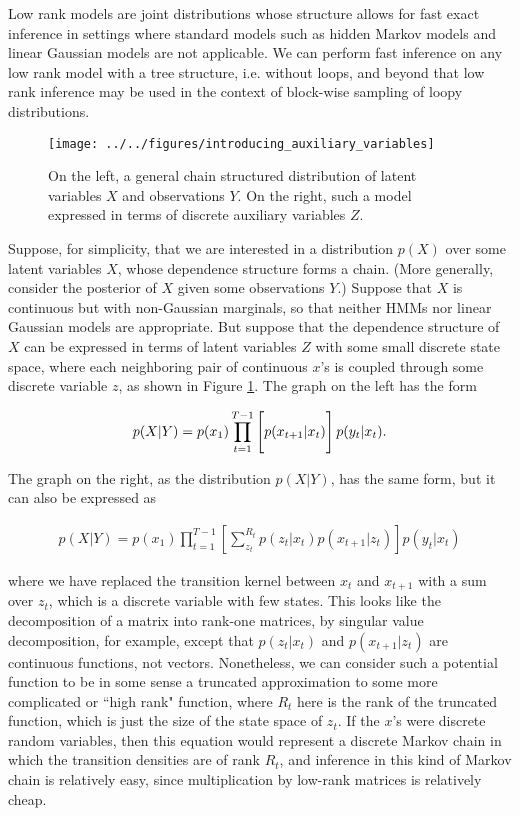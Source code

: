 \documentclass[11pt]{article}
\begin{document}
Low rank models are joint distributions whose structure allows for fast exact inference in settings where standard models such as hidden Markov models and linear Gaussian models are not applicable. We can perform fast inference on any low rank model with a tree structure, i.e. without loops, and beyond that low rank inference may be used in the context of block-wise sampling of loopy distributions. 

\begin{figure}[h]
\centering
\texttt{[image: ../../figures/introducing\_auxiliary\_variables]}
\caption{On the left, a general chain structured distribution of latent variables $X$ and observations $Y$. On the right, such a model expressed in terms of discrete auxiliary variables $Z$.}
\label{fig:introducing_auxiliary_variables}
\end{figure}

Suppose, for simplicity, that we are interested in a distribution $p(X)$ over some latent variables $X$, whose dependence structure forms a chain. (More generally, consider the posterior of $X$ given some observations $Y$.) Suppose that $X$ is continuous but with non-Gaussian marginals, so that neither HMMs nor linear Gaussian models are appropriate. But suppose that the dependence structure of $X$ can be expressed in terms of latent variables $Z$ with some small discrete state space, where each neighboring pair of continuous $x$'s is coupled through some discrete variable $z$, as shown in Figure \ref{fig:introducing_auxiliary_variables}. The graph on the left has the form

\begin{align*}
p(X|Y)=p(x_1)\prod_{t=1}^{T-1}\left[\vphantom{\sum_{i}^{J}}p(x_{t+1}|x_t)\right]p(y_t|x_t).
\end{align*}

\noindent The graph on the right, as the distribution $p(X|Y)$, has the same form, but it can also be expressed as

\begin{align*}
p(X|Y)=p(x_1)\prod_{t=1}^{T-1}\left[\sum_{z_t}^{R_t}p(z_t|x_t)p(x_{t+1}|z_t)\right]p(y_t|x_t)
\end{align*}

\noindent where we have replaced the transition kernel between $x_t$ and $x_{t+1}$ with a sum over $z_t$, which is a discrete variable with few states. This looks like the decomposition of a matrix into rank-one matrices, by singular value decomposition, for example, except that $p(z_t | x_t)$ and $p(x_{t+1} | z_t)$ are continuous functions, not vectors. Nonetheless, we can consider such a potential function to be in some sense a truncated approximation to some more complicated or ``high rank" function, where $R_t$ here is the rank of the truncated function, which is just the size of the state space of $z_t$. If the $x$'s were discrete random variables, then this equation would represent a discrete Markov chain in which the transition densities are of rank $R_t$, and inference in this kind of Markov chain is relatively easy, since multiplication by low-rank matrices is relatively cheap.
\end{document}
